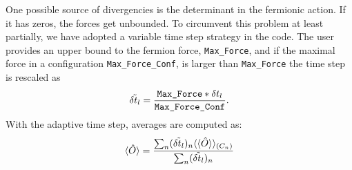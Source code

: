 One possible source of divergencies is the determinant in the fermionic action. If it has zeros, the forces get unbounded.  To circumvent this problem at least partially, we have adopted a  variable time step strategy in the code.  The user   provides an upper bound to the fermion force, \texttt{Max\_Force},  and  if the maximal force in a configuration \texttt{Max\_Force\_Conf}, is larger than \texttt{Max\_Force} the time step  is rescaled as 
\begin{equation}
     \tilde{\delta t_{l}}   =  \frac{ \texttt{Max\_Force} *  \delta t_{l} }{\texttt{Max\_Force\_Conf}}.
\end{equation}
With the adaptive time  step,  averages are computed as: 
\begin{equation}
   \langle \hat{O} \rangle = \frac{ \sum_n (  \tilde{\delta t_{l}}  )_n \langle \langle \hat{O} \rangle   \rangle_{(C_n)}} {\sum_n (  \tilde{\delta t_{l}}  )_n } 
\end{equation}

